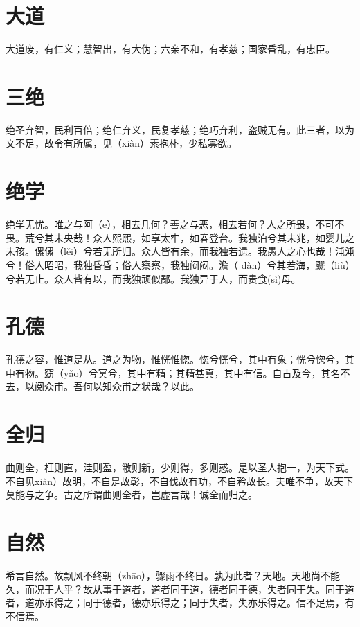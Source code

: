 \documentclass[a4paper,12pt,UTF8,twoside]{ctexbook}
\begin{document}
	\chapter{大道}
	
	大道废，有仁义；慧智出，有大伪；六亲不和，有孝慈；国家昏乱，有忠臣。
	
	
	
	\chapter{三绝}
	
	绝圣弃智，民利百倍；绝仁弃义，民复孝慈；绝巧弃利，盗贼无有。此三者，以为文不足，故令有所属，见（xiàn）素抱朴，少私寡欲。
	
	
	
	
	\chapter{绝学}
	绝学无忧。唯之与阿（ē），相去几何？善之与恶，相去若何？人之所畏，不可不畏。荒兮其未央哉！众人熙熙，如享太牢，如春登台。我独泊兮其未兆，如婴儿之未孩。傫傫（lěi）兮若无所归。众人皆有余，而我独若遗。我愚人之心也哉！沌沌兮！俗人昭昭，我独昏昏；俗人察察，我独闷闷。澹（
	dàn）兮其若海，飂（liù）兮若无止。众人皆有以，而我独顽似鄙。我独异于人，而贵食(sì)母。
	
	
	
	
	\chapter{孔德}
	孔德之容，惟道是从。道之为物，惟恍惟惚。惚兮恍兮，其中有象；恍兮惚兮，其中有物。窈（yǎo）兮冥兮，其中有精；其精甚真，其中有信。自古及今，其名不去，以阅众甫。吾何以知众甫之状哉？以此。
	
	
	
	
	
	\chapter{全归}
	曲则全，枉则直，洼则盈，敝则新，少则得，多则惑。是以圣人抱一，为天下式。不自见xiàn）故明，不自是故彰，不自伐故有功，不自矜故长。夫唯不争，故天下莫能与之争。古之所谓曲则全者，岂虚言哉！诚全而归之。
	
	
	
	\chapter{自然}
	
	希言自然。故飘风不终朝（zhāo），骤雨不终日。孰为此者？天地。天地尚不能久，而况于人乎？故从事于道者，道者同于道，德者同于德，失者同于失。同于道者，道亦乐得之；同于德者，德亦乐得之；同于失者，失亦乐得之。信不足焉，有不信焉。
	
\end{document}
